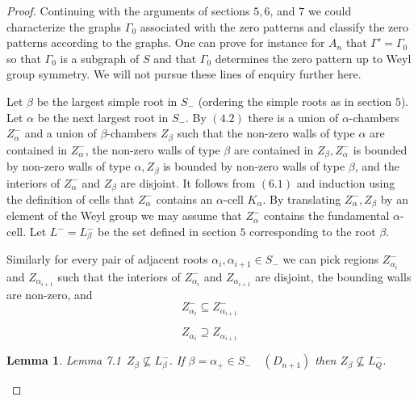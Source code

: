 \documentclass{memo-l}
\newtheorem{lemma}[theorem]{Lemma}
\theoremstyle{definition}
\theoremstyle{remark}
\numberwithin{section}{chapter}
\numberwithin{equation}{chapter}
\begin{document}
\begin{proof}
   Continuing with the arguments of sections $5,6$, and $7$ we could
characterize the graphs ${\Gamma}_{0}$ associated with the zero patterns
and classify the zero patterns according to the graphs.  One can prove for
instance for $A_{n}$ that ${\Gamma}'={\Gamma}_{0}$ so that ${\Gamma}_{0}$
is a subgraph of $S$ and that ${\Gamma}_{0}$ determines the zero pattern up
to Weyl group symmetry.  We will not pursue these lines of enquiry further
here.

   Let ${\beta}$ be the largest simple root in $S_{-}$  (ordering the
simple roots as in section $5$).  Let ${\alpha}$ be the next largest root in
$S_{-}$.  By $(4.2)$ there is a union of ${\alpha}$-chambers
$Z_{{\alpha}}^{-}$ and a union of ${\beta}$-chambers $Z_{{\beta}}$ such
that the non-zero walls of type ${\alpha}$ are contained in
$Z_{{\alpha}}^{-}$, the non-zero walls of type ${\beta}$ are contained in
$Z_{{\beta}}, Z_{{\alpha}}^{-}$ is bounded by non-zero walls of type
${\alpha}, Z_{{\beta}}$ is bounded by non-zero walls of type ${\beta}$, and
the interiors of $Z_{{\alpha}}^{-}$ and $Z_{{\beta}}$ are disjoint.  It
follows from $(6.1)$ and induction using the definition of cells that
$Z_{{\alpha}}^{-}$ contains an ${\alpha}$-cell $K_{{\alpha}}$.  By
translating $Z_{{\alpha}}^{-}, Z_{{\beta}}$ by an element of the Weyl group
we may assume that $Z_{{\alpha}}^{-}$ contains the fundamental
${\alpha}$-cell.  Let $L^{-} = L_{{\beta}}^{-}$ be the set defined in
section $5$ corresponding to the root ${\beta}$.

   Similarly for every pair of adjacent roots ${\alpha}_{i},
{\alpha}_{i+1}  \in  S_{-}$ we can pick regions $Z_{{\alpha_i}} ^{-}$
and $Z_{{\alpha_{i+1}}} ^{ }$ such that the interiors of $Z_{{\alpha_i}}
^{-}$ and $Z_{{\alpha_{i+1}}}$ are disjoint, the bounding walls are
non-zero, and
$$
Z_{{\alpha_i}} ^{-} {\subseteq} Z_{{\alpha_{i+1}}} ^{-}$$

$$Z_{{\alpha_i}} {\supseteq} Z_{{\alpha_{i+1}}}$$

\medpagebreak


\begin{lemma}{Lemma 7.1}\ $Z_{{\beta}}{\not\subseteq}L_{{\beta}}^{-}$.  If
${\beta} = {\alpha}_{+}  \in  S_{-} \quad (D_{n+1})$ then
$Z_{{\beta}}{\not\subseteq}L_{Q}^{-}$.
\end{lemma}



\end{proof}
\end{document}
